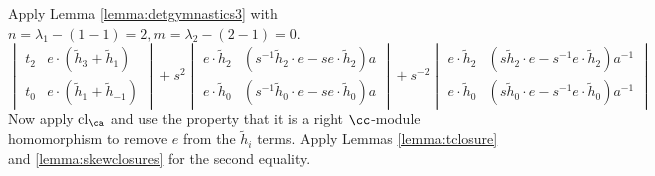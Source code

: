 \begin{example}
\[\]
Apply Lemma \ref{lemma:detgymnastics3} with $n=\lambda_1 - (1-1) = 2, m=\lambda_2 - (2-1) = 0$.
\[
\begin{vmatrix}
t_2 & e \cdot ( \tilde{h}_3 + \tilde{h}_1 ) \\
t_0 & e \cdot ( \tilde{h}_1 + \tilde{h}_{-1} )
\end{vmatrix}
+ s^2
\begin{vmatrix}
e \cdot \tilde{h}_2 & ( s^{-1} \tilde{h}_2 \cdot e - s e \cdot \tilde{h}_2 ) a \\
e \cdot \tilde{h}_0 & ( s^{-1} \tilde{h}_0 \cdot e - s e \cdot \tilde{h}_0 ) a
\end{vmatrix} 
+ s^{-2}
\begin{vmatrix}
e \cdot \tilde{h}_2 & ( s \tilde{h}_2 \cdot e - s^{-1} e \cdot \tilde{h}_2 ) a^{-1} \\
e \cdot \tilde{h}_0 & ( s \tilde{h}_0 \cdot e - s^{-1} e \cdot \tilde{h}_0 ) a^{-1}
\end{vmatrix}
\]
Now apply $\cl_\ca$ and use the property that it is a right $\cc$-module homomorphism to remove $e$ from the $\tilde{h}_i$ terms. Apply Lemmas \ref{lemma:tclosure} and \ref{lemma:skewclosures} for the second equality.


\end{example}
